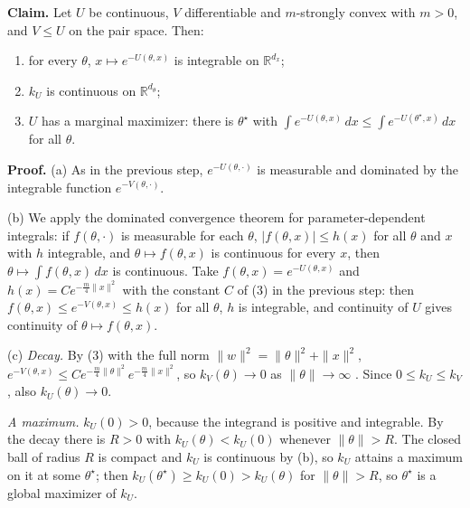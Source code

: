 \documentclass[11pt,a4paper]{report}
\begin{document}
\textbf{Claim.} Let \(U\) be continuous, \(V\) differentiable and \(m\)-strongly convex with \(m>0\), and \(V\le U\) on the pair space. Then:



\begin{enumerate}


\item for every \(\theta\), \(x\mapsto e^{-U(\theta,x)}\) is integrable on \(\mathbb R^{d_x}\);

\item \(k_U\) is continuous on \(\mathbb R^{d_\theta}\);

\item \(U\) has a marginal maximizer: there is \(\theta^\star\) with \(\int e^{-U(\theta,x)}\,dx\le\int e^{-U(\theta^\star,x)}\,dx\) for all \(\theta\).

\end{enumerate}



\textbf{Proof.} (a) As in the previous step, \(e^{-U(\theta,\cdot)}\) is measurable and dominated by the integrable function \(e^{-V(\theta,\cdot)}\).




(b) We apply the dominated convergence theorem for parameter-dependent integrals: if \(f(\theta,\cdot)\) is measurable for each \(\theta\), \(|f(\theta,x)|\le h(x)\) for all \(\theta\) and \(x\) with \(h\) integrable, and \(\theta\mapsto f(\theta,x)\) is continuous for every \(x\), then \(\theta\mapsto\int f(\theta,x)\,dx\) is continuous. Take \(f(\theta,x)=e^{-U(\theta,x)}\) and \(h(x)=Ce^{-\frac m4\|x\|^2}\) with the constant \(C\) of (3) in the previous step: then \(f(\theta,x)\le e^{-V(\theta,x)}\le h(x)\) for all \(\theta\), \(h\) is integrable, and continuity of \(U\) gives continuity of \(\theta\mapsto f(\theta,x)\).




(c) \emph{Decay.} By (3) with the full norm \(\|w\|^2=\|\theta\|^2+\|x\|^2\), \(e^{-V(\theta,x)}\le Ce^{-\frac m4\|\theta\|^2}e^{-\frac m4\|x\|^2}\), so \(k_V(\theta)\to0\) as \(\|\theta\|\to\infty\) \cite[Section~3.9.4]{LangevinLean2026IPLA}. Since \(0\le k_U\le k_V\), also \(k_U(\theta)\to0\).




\emph{A maximum.} \(k_U(0)>0\), because the integrand is positive and integrable. By the decay there is \(R>0\) with \(k_U(\theta)<k_U(0)\) whenever \(\|\theta\|>R\). The closed ball of radius \(R\) is compact and \(k_U\) is continuous by (b), so \(k_U\) attains a maximum on it at some \(\theta^\star\); then \(k_U(\theta^\star)\ge k_U(0)>k_U(\theta)\) for \(\|\theta\|>R\), so \(\theta^\star\) is a global maximizer of \(k_U\).
\end{document}

